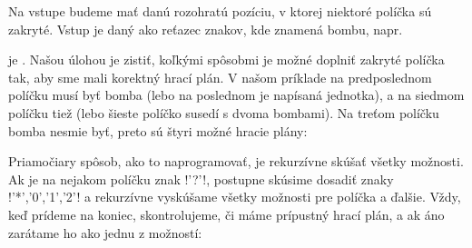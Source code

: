 

Na vstupe budeme mať danú rozohratú pozíciu, v ktorej niektoré políčka sú zakryté. 
Vstup je daný ako reťazec znakov, kde  znamená bombu,  napr.




je . Našou úlohou je zistiť, koľkými spôsobmi je možné doplniť zakryté políčka tak, aby sme mali korektný hrací plán. V našom príklade
na predposlednom políčku musí byť bomba (lebo na poslednom je napísaná jednotka), a na siedmom políčku tiež (lebo šieste políčko susedí s dvoma bombami).
Na treťom políčku bomba nesmie byť, preto sú štyri možné hracie plány:





Priamočiary spôsob, ako to naprogramovať, je rekurzívne skúšať všetky možnosti. Ak je na nejakom políčku  znak \prg!'?'!, postupne skúsime dosadiť
znaky \prg!'*','0','1','2'! a rekurzívne vyskúšame všetky možnosti pre políčka  a ďalšie. Vždy, keď prídeme na koniec, skontrolujeme, 
či máme prípustný hrací plán, a ak áno zarátame ho ako jednu z možností:\\

